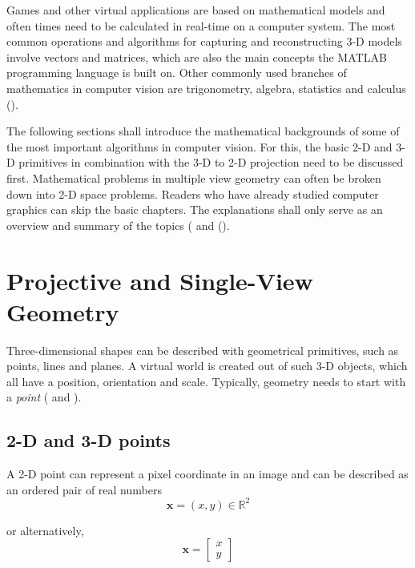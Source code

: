 \label{c:Math}
Games and other virtual applications are based on mathematical models and often times need to be calculated in real-time on a computer system. The most common operations and algorithms for capturing and reconstructing 3-D models involve vectors and matrices, which are also the main concepts the MATLAB programming language is built on. Other commonly used branches of mathematics in computer vision are trigonometry, algebra, statistics and calculus (\cite[p.165]{Gregory.2014}).

The following sections shall introduce the mathematical backgrounds of some of the most important algorithms in computer vision. For this, the basic 2-D and 3-D primitives in combination with the 3-D to 2-D projection need to be discussed first. Mathematical problems in multiple view geometry can often be broken down into 2-D space problems. Readers who have already studied computer graphics can skip the basic chapters. The explanations shall only serve as an overview and summary of the topics (\cite[p.29]{Szeliski.2011} and (\cite[p.165 et seq.]{Gregory.2014}).

\section{Projective and Single-View Geometry}
Three-dimensional shapes can be described with geometrical primitives, such as points, lines and planes. A virtual world is created out of such 3-D objects, which all have a position, orientation and scale. Typically, geometry needs to start with a \textit{point} (\cite[p.29 et seqq.]{Szeliski.2011} and \cite[p.166 et seqq.]{Gregory.2014}).

\subsection{2-D and 3-D points}\label{ssec:Points}
A 2-D point can represent a pixel coordinate in an image and can be described as an ordered pair of real numbers 
\begin{equation}
\mathbf{x} = (x,y)\in \mathbb{R}^2
\end{equation}

or alternatively, 
\begin{equation} 
\mathbf{x}=
  \begin{bmatrix}
   x \\
   y
  \end{bmatrix}
\end{equation}

